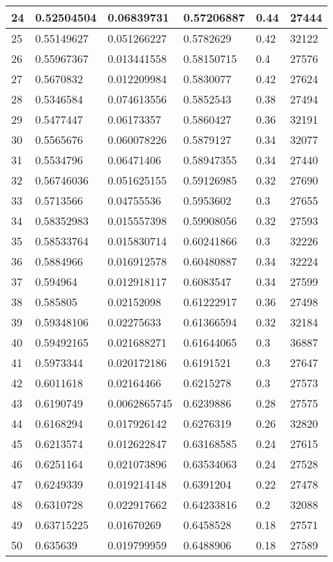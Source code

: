 \begin{longtable}{|l|l|l|l|l|l|}
24 & 0.52504504 & 0.06839731 & 0.57206887 & 0.44 & 27444 \\ \hline 
25 & 0.55149627 & 0.051266227 & 0.5782629 & 0.42 & 32122 \\ \hline 
26 & 0.55967367 & 0.013441558 & 0.58150715 & 0.4 & 27576 \\ \hline 
27 & 0.5670832 & 0.012209984 & 0.5830077 & 0.42 & 27624 \\ \hline 
28 & 0.5346584 & 0.074613556 & 0.5852543 & 0.38 & 27494 \\ \hline 
29 & 0.5477447 & 0.06173357 & 0.5860427 & 0.36 & 32191 \\ \hline 
30 & 0.5565676 & 0.060078226 & 0.5879127 & 0.34 & 32077 \\ \hline 
31 & 0.5534796 & 0.06471406 & 0.58947355 & 0.34 & 27440 \\ \hline 
32 & 0.56746036 & 0.051625155 & 0.59126985 & 0.32 & 27690 \\ \hline 
33 & 0.5713566 & 0.04755536 & 0.5953602 & 0.3 & 27655 \\ \hline 
34 & 0.58352983 & 0.015557398 & 0.59908056 & 0.32 & 27593 \\ \hline 
35 & 0.58533764 & 0.015830714 & 0.60241866 & 0.3 & 32226 \\ \hline 
36 & 0.5884966 & 0.016912578 & 0.60480887 & 0.34 & 32224 \\ \hline 
37 & 0.594964 & 0.012918117 & 0.6083547 & 0.34 & 27599 \\ \hline 
38 & 0.585805 & 0.02152098 & 0.61222917 & 0.36 & 27498 \\ \hline 
39 & 0.59348106 & 0.02275633 & 0.61366594 & 0.32 & 32184 \\ \hline 
40 & 0.59492165 & 0.021688271 & 0.61644065 & 0.3 & 36887 \\ \hline 
41 & 0.5973344 & 0.020172186 & 0.6191521 & 0.3 & 27647 \\ \hline 
42 & 0.6011618 & 0.02164466 & 0.6215278 & 0.3 & 27573 \\ \hline 
43 & 0.6190749 & 0.0062865745 & 0.6239886 & 0.28 & 27575 \\ \hline 
44 & 0.6168294 & 0.017926142 & 0.6276319 & 0.26 & 32820 \\ \hline 
45 & 0.6213574 & 0.012622847 & 0.63168585 & 0.24 & 27615 \\ \hline 
46 & 0.6251164 & 0.021073896 & 0.63534063 & 0.24 & 27528 \\ \hline 
47 & 0.6249339 & 0.019214148 & 0.6391204 & 0.22 & 27478 \\ \hline 
48 & 0.6310728 & 0.022917662 & 0.64233816 & 0.2 & 32088 \\ \hline 
49 & 0.63715225 & 0.01670269 & 0.6458528 & 0.18 & 27571 \\ \hline 
50 & 0.635639 & 0.019799959 & 0.6488906 & 0.18 & 27589 \\ \hline 
\end{longtable}